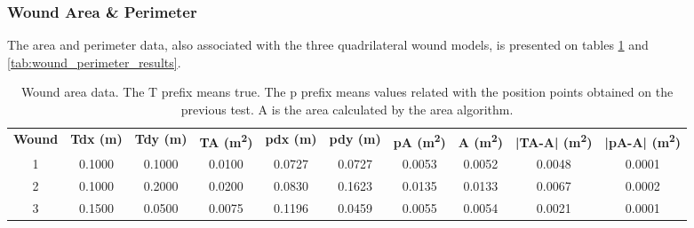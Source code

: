 
\subsubsection*{Wound Area \& Perimeter}
\label{subsubsec:simulated_system_results_camera_spatial_data_processing_area_perimeter}

The area and perimeter data, also associated with the three quadrilateral wound models, is presented on tables \ref{tab:wound_area_results} and \ref{tab:wound_perimeter_results}.

\begin{table}[htbp]
    \centering
    \caption[Wound area data.]{Wound area data. The T prefix means true. The p prefix means values related with the position points obtained on the previous test. A is the area calculated by the area algorithm.}
    \begin{adjustbox}{width=1.2\textwidth,center=\textwidth}
    \begin{tabular}{c|c|c|c|c|c|c|c|c|c}
         \toprule
         \textbf{Wound} & \textbf{Tdx (m)} & \textbf{Tdy (m)} & \textbf{TA (\si{\meter\squared})} & \textbf{pdx (m)} & \textbf{pdy (m)} & \textbf{pA (\si{\meter\squared})} & \textbf{A (\si{\meter\squared})} & \textbf{|TA-A| (\si{\meter\squared})} & \textbf{|pA-A| (\si{\meter\squared})} \\
         1 & 0.1000 & 0.1000 & 0.0100 & 0.0727 & 0.0727 & 0.0053 & 0.0052 & 0.0048 & 0.0001 \\
         2 & 0.1000 & 0.2000 & 0.0200 & 0.0830 & 0.1623 & 0.0135 & 0.0133 & 0.0067 & 0.0002 \\
         3 & 0.1500 & 0.0500 & 0.0075 & 0.1196 & 0.0459 & 0.0055 & 0.0054 & 0.0021 & 0.0001 \\
         \bottomrule
    \end{tabular}
    \end{adjustbox}
    \label{tab:wound_area_results}
\end{table}

